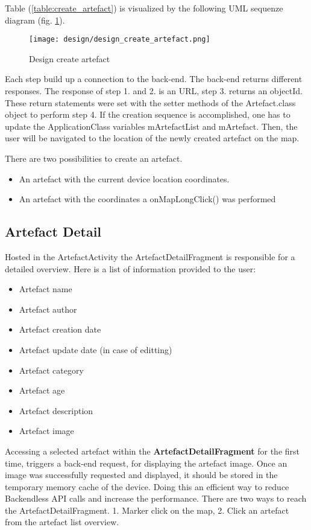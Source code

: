 Table (\ref{table:create_artefact}) is visualized by the following UML sequenze diagram (fig. \ref{fig:design_create_artefact}).

\begin{figure}[H]
	\centering \texttt{[image: design/design\_create\_artefact.png]}
	\caption[Design create artefact]{Design create artefact}	
	\label{fig:design_create_artefact}
\end{figure}

Each step build up a connection to the back-end. The back-end returns different responses. The response of step 1. and 2. is an URL, step 3. returns an objectId. These return statements were set with the setter methods of the Artefact.class object to perform step 4.
If the creation sequence is accomplished, one has to update the ApplicationClass variables mArtefactList and mArtefact. Then, the user will be navigated to the location of the newly created artefact on the map. 

There are two possibilities to create an artefact. 
\begin{itemize}
\item[1.] An artefact with the current device location coordinates.
\item[2.] An artefact with the coordinates a onMapLongClick() was performed
\end{itemize}


\subsection{Artefact Detail}
\label{section_artefact_detail}
Hosted in the ArtefactActivity the ArtefactDetailFragment is responsible for a detailed overview. Here is a list of information provided to the user:
\begin{itemize}
\item Artefact name
\item Artefact author
\item Artefact creation date
\item Artefact update date (in case of editting)
\item Artefact category
\item Artefact age
\item Artefact description
\item Artefact image
\end{itemize}

Accessing a selected artefact within the \textbf{ArtefactDetailFragment} for the first time, triggers a back-end request, for displaying the artefact image. Once an image was successfully requested and displayed, it should be stored in the temporary memory cache of the device. Doing this an efficient way to reduce Backendless API calls and increase the performance.
There are two ways to reach the ArtefactDetailFragment. 1. Marker click on the map, 2. Click an artefact from the artefact list overview.

